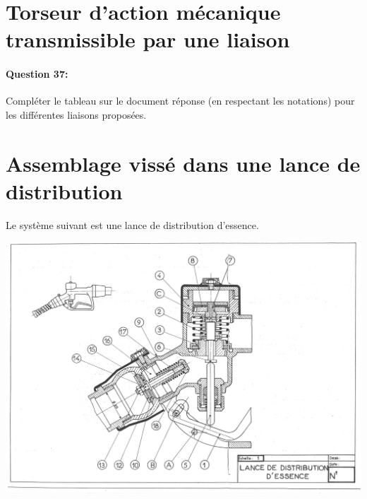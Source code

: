 \section{Torseur d'action mécanique transmissible par une liaison}

\paragraph{Question 37:} Compléter le tableau sur le document réponse (en respectant les notations) pour les différentes liaisons proposées.

\section{Assemblage vissé dans une lance de distribution}

Le système suivant est une lance de distribution d'essence.

\begin{center}
 \includegraphics[width=\linewidth]{img/lance}
\end{center}

